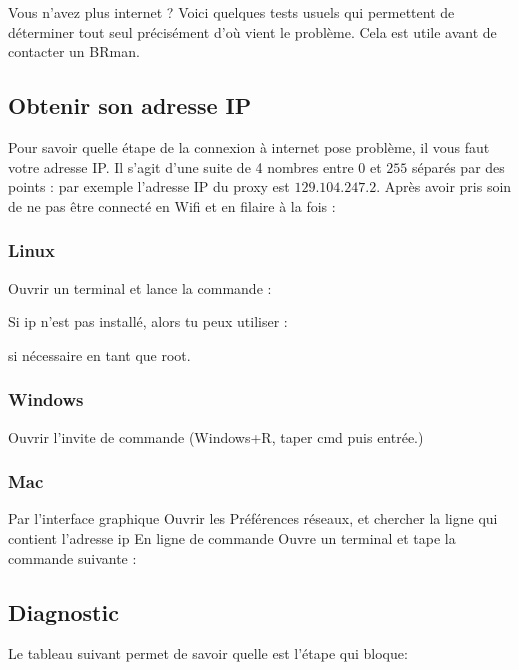 \label{diagnostic}
Vous n'avez plus internet ? Voici quelques tests usuels qui permettent de déterminer tout seul précisément d'où vient le problème. Cela est utile avant de contacter un BRman.

\subsection{Obtenir son adresse IP}
Pour savoir quelle étape de la connexion à internet pose problème, il vous faut votre adresse IP. Il s'agit d'une suite de 4 nombres entre $0$ et $255$ séparés par des points : par exemple l'adresse IP du proxy est $129.104.247.2$. Après avoir pris soin de ne pas être connecté en Wifi et en filaire à la fois :

\subsubsection{Linux}
Ouvrir un terminal et lance la commande :


Si ip n'est pas installé, alors tu peux utiliser :

si nécessaire en tant que root.
 
\subsubsection{Windows}
Ouvrir l'invite de commande (Windows+R, taper cmd puis entrée.)

 
\subsubsection{Mac}
Par l'interface graphique
Ouvrir les Préférences réseaux, et chercher la ligne qui contient l'adresse ip
En ligne de commande
Ouvre un terminal et tape la commande suivante :

\subsection{Diagnostic}
Le tableau suivant permet de savoir quelle est l'étape qui bloque:

